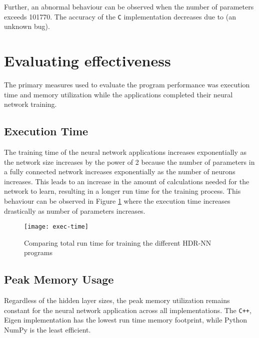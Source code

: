 Further, an abnormal behaviour can be observed when the number of parameters exceeds 101770. The accuracy of the \texttt{C} implementation decreases due to (an unknown bug).



\section{Evaluating effectiveness}

The primary measures used to evaluate the program performance was execution time and memory utilization while the applications completed their neural network training.

\subsection{Execution Time}
The training time of the neural network applications increases exponentially as the network size increases by the power of 2 because the number of parameters in a fully connected network increases exponentially as the number of neurons increases. This leads to an increase in the amount of calculations needed for the network to learn, resulting in a longer run time for the training process. This behaviour can be observed in Figure \ref{hdrnn-exectime} where the execution time increases drastically as number of parameters increases.

\begin{figure}[!ht]
	\centering
	\texttt{[image: exec-time]}
	\caption[Execution Time vs Model Parameters]{Comparing total run time for training the different HDR-NN programs}
	\label{hdrnn-exectime}
\end{figure}

\subsection{Peak Memory Usage}
Regardless of the hidden layer sizes, the peak memory utilization remains constant for the neural network application across all implementations. The \texttt{C++}, Eigen implementation has the lowest run time memory footprint, while Python NumPy is the least efficient.

